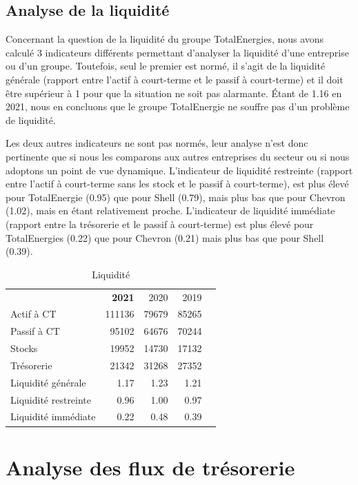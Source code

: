 \documentclass[12pt]{article}
\begin{document}
\subsection{Analyse de la liquidité}
Concernant la question de la liquidité du groupe TotalEnergies, nous avons calculé 3 indicateurs 
différents permettant d'analyser la liquidité d'une entreprise ou d'un groupe.
Toutefois, seul le premier est normé, il s'agit de la liquidité générale (rapport entre l'actif à 
court-terme et le passif à court-terme) et il doit être supérieur à 1 pour que
la situation ne soit pas alarmante. Étant de 1.16 en 2021, nous en concluons que le groupe 
TotalEnergie ne souffre pas d'un problème de liquidité.

Les deux autres indicateurs ne sont pas normés, leur analyse n'est donc pertinente que si nous les 
comparons aux autres entreprises du secteur ou si nous adoptons un point de vue dynamique.
L'indicateur de liquidité restreinte (rapport  entre l'actif à court-terme sans les stock et le passif 
à court-terme), est plus élevé pour TotalEnergie (0.95) que pour Shell (0.79), mais plus bas 
que pour Chevron (1.02), mais en étant relativement proche.
L'indicateur de liquidité immédiate (rapport entre la trésorerie et le passif à court-terme) est plus 
élevé pour TotalEnergies (0.22) que pour Chevron (0.21) mais plus bas que pour Shell (0.39).
\begin{table}[H]
    \sffamily
    \centering
    \caption{Liquidité}
    \label{table:liquide}
    \begin{tabular}{l*{1}{rrrr}}
    \toprule
~&\textbf{2021} & 2020 & 2019 \\ 
\cmidrule(r){1-1}\cmidrule(r){2-4}
Actif à CT & 111136 & 79679 & 85265 \\ 
        Passif à CT & 95102 & 64676 & 70244 \\ 
        Stocks & 19952 & 14730 & 17132 \\ 
        Trésorerie & 21342 & 31268 & 27352 \\
\cmidrule(r){1-1}\cmidrule(r){2-4}
        Liquidité générale & 1.17 & 1.23 & 1.21 \\ 
        Liquidité restreinte & 0.96 & 1.00 & 0.97 \\ 
        Liquidité immédiate & 0.22 & 0.48 & 0.39 \\
\bottomrule
\end{tabular}
\end{table}
\section{Analyse des flux de trésorerie}
\end{document}
